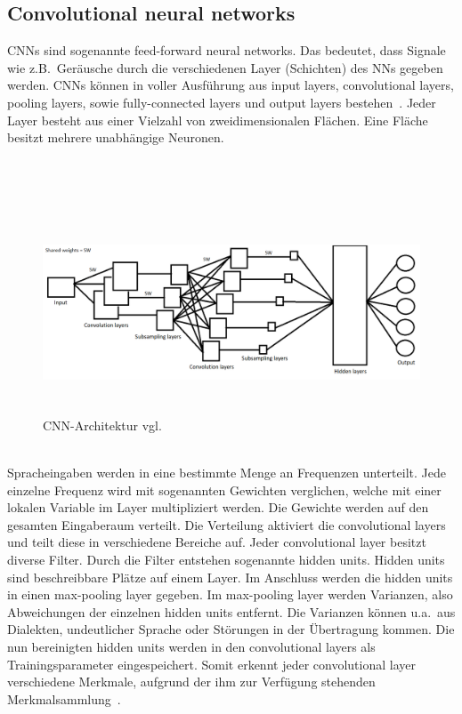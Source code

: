 \subsection{Convolutional neural networks}
CNNs sind sogenannte feed-forward neural networks. Das bedeutet, dass Signale wie z.B.~Geräusche durch die verschiedenen Layer (Schichten) des NNs gegeben werden. CNNs können in voller Ausführung aus input layers, convolutional layers, pooling layers, sowie fully-connected layers und output layers bestehen~\cite{facialemotionrecusingcnn}. Jeder Layer besteht aus einer Vielzahl von zweidimensionalen Flächen. Eine Fläche besitzt mehrere unabhängige Neuronen.
\\
\\
\\
\\
\begin{figure}[h]
\includegraphics[width=\linewidth, height=6cm]{Bilder/CNN/CNNArchitektur.png}
\caption{CNN-Architektur vgl.~\cite{noisycnn}}
\end{figure}
\\
Spracheingaben werden in eine bestimmte Menge an Frequenzen unterteilt. Jede einzelne Frequenz wird mit sogenannten Gewichten verglichen, welche mit einer lokalen Variable im Layer multipliziert werden. Die Gewichte werden auf den gesamten Eingaberaum verteilt. Die Verteilung aktiviert die convolutional layers und teilt diese in verschiedene Bereiche auf. Jeder convolutional layer besitzt diverse Filter. Durch die Filter entstehen sogenannte hidden units. Hidden units sind beschreibbare Plätze auf einem Layer. Im Anschluss werden die hidden units in einen max-pooling layer gegeben. Im max-pooling layer werden Varianzen, also Abweichungen der einzelnen hidden units entfernt. Die Varianzen können u.a.~aus Dialekten, undeutlicher Sprache oder Störungen in der Übertragung kommen. Die nun bereinigten hidden units werden in den convolutional layers als Trainingsparameter eingespeichert. Somit erkennt jeder convolutional layer verschiedene Merkmale, aufgrund der ihm zur Verfügung stehenden Merkmalsammlung~\cite{usingcnn}.